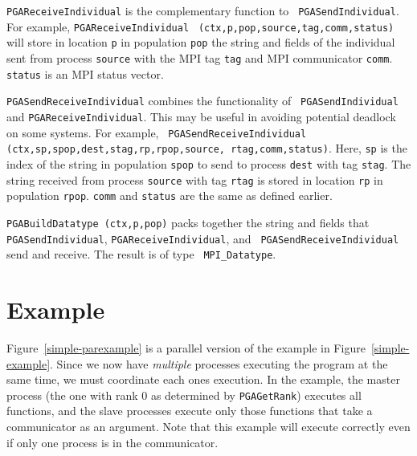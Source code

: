 \documentclass{report}
\begin{document}
\begin{sloppypar}
{\tt PGAReceiveIndividual} is the complementary function to {\tt
PGASendIndividual}.  For example, {\tt PGAReceiveIndividual} {\tt
(ctx,p,pop,source,tag,comm,status)} will store in location {\tt p} in
population {\tt pop} the string and fields of the individual sent from process
{\tt source} with the MPI tag {\tt tag} and MPI communicator {\tt comm}.  {\tt
status} is an MPI status vector.

{\tt PGASendReceiveIndividual} combines the functionality of {\tt
PGASendIndividual} and {\tt PGAReceiveIndividual}.  This may be useful in
avoiding potential deadlock on some systems.  For example, {\tt
PGASendReceiveIndividual} {\tt (ctx,sp,spop,dest,stag,rp,rpop,source,
rtag,comm,status)}.  Here, {\tt sp} is the index of the string in population
{\tt spop} to send to process {\tt dest} with tag {\tt stag}.  The string
received from process {\tt source} with tag {\tt rtag} is stored in location
{\tt rp} in population {\tt rpop}.  {\tt comm} and {\tt status} are the same
as defined earlier.

{\tt PGABuildDatatype (ctx,p,pop)} packs together the string and fields that
{\tt PGASendIndividual}, {\tt PGAReceiveIndividual}, and {\tt
PGASendReceiveIndividual} send and receive.  The result is of type {\tt
MPI\_Datatype}.
\end{sloppypar}
 

\section{Example}\label{sec:par-example}

Figure~\ref{simple-parexample} is a parallel version of the example in
Figure~\ref{simple-example}.  Since we now have {\em multiple} processes
executing the program at the same time, we must coordinate each ones
execution.  In the example, the master process (the one with rank 0 as
determined by {\tt PGAGetRank}) executes all functions, and the slave
processes execute only those functions that take a communicator as an
argument.  Note that this example will execute correctly even if only one
process is in the communicator.
\end{document}
